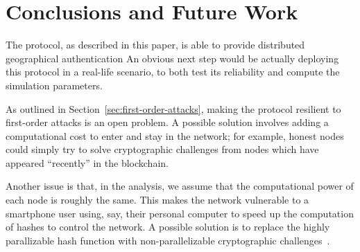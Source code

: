 \section{Conclusions and Future Work}


The protocol, as described in this paper,
is able to provide distributed geographical authentication
An obvious next step would be actually deploying this protocol in a real-life scenario,
to both test its reliability and compute the simulation parameters.

As outlined in Section~\ref{sec:first-order-attacks},
making the protocol resilient to first-order attacks is an open problem.
A possible solution involves adding a computational cost
to enter and stay in the network;
for example,
honest nodes could simply try to solve cryptographic challenges
from nodes which have appeared ``recently'' in the blockchain.

Another issue is that,
in the analysis,
we assume that the computational power of each node
is roughly the same.
This makes the network vulnerable to a smartphone user using,
say,
their personal computer to speed up the computation of hashes
to control the network.
A possible solution is to replace the highly parallizable hash function
with non-parallelizable cryptographic challenges~\cite{Tritilanunt2007}.
